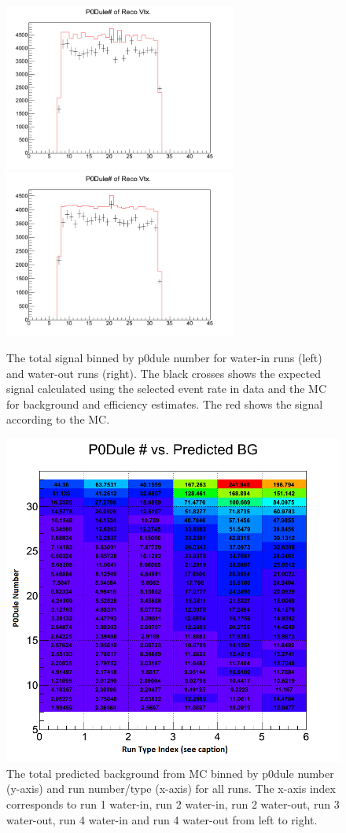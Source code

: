 \begin{figure}[h]
\centering
\includegraphics[width=3in]{Figures/TN100Plots/cNBEw.png}
\includegraphics[width=3in]{Figures/TN100Plots/cNBEa.png}
\caption{The total signal binned by p0dule number for water-in runs (left) and water-out runs (right). The black crosses shows the expected signal calculated using the selected event rate in data and the MC for background and efficiency estimates. The red shows the signal according to the MC.}
\label{fig:xstot}
\end{figure}

\begin{figure}[h]
\centering
\includegraphics[width=5in]{Figures/TN100Plots/cBG_RvZ.png}
\caption{The total predicted background from MC binned by p0dule number (y-axis) and run number/type (x-axis) for all runs. The x-axis index corresponds to run 1 water-in, run 2 water-in, run 2 water-out, run 3 water-out, run 4 water-in and run 4 water-out from left to right.}
\label{fig:xsBGvZ}
\end{figure}


